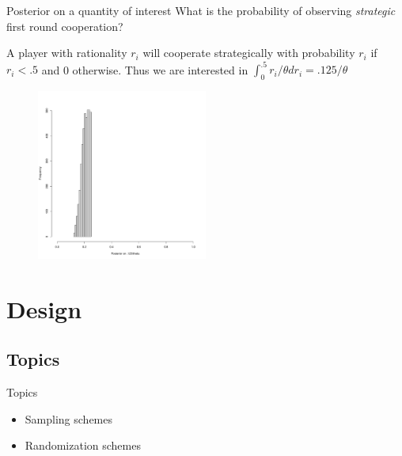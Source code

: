 \documentclass[
  11pt,
  ignorenonframetext,
]{beamer}
\providecommand{\tightlist}{%
  \setlength{\itemsep}{0pt}\setlength{\parskip}{0pt}}\usepackage{longtable,booktabs,array}
\begin{document}
\begin{frame}{Posterior on a quantity of interest}
\protect\hypertarget{posterior-on-a-quantity-of-interest}{}
What is the probability of observing \emph{strategic} first round
cooperation?

A player with rationality \(r_i\) will cooperate strategically with
probability \(r_i\) if \(r_i<.5\) and 0 otherwise. Thus we are
interested in \(\int_0^{.5}r_i/\theta dr_i = .125/\theta\)

\begin{figure}

{\centering \includegraphics[width=0.5\textwidth,height=\textheight]{0_lectures_files/figure-beamer/unnamed-chunk-351-1.pdf}

}

\end{figure}
\end{frame}

\hypertarget{design}{%
\section{Design}\label{design}}

\hypertarget{topics}{%
\subsection{Topics}\label{topics}}

\begin{frame}{Topics}
\begin{itemize}
\tightlist
\item
  Sampling schemes
\item
  Randomization schemes
\end{itemize}
\end{frame}
\end{document}

